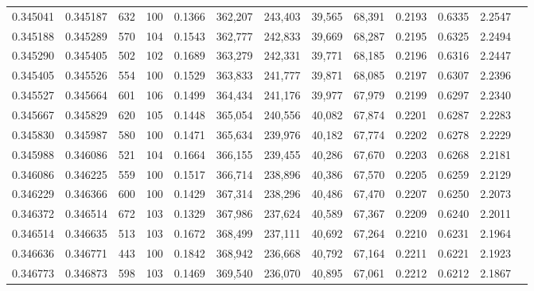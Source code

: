 \begin{tabular}{rrrrrrrrrrrrr}
0.345041 & 0.345187 &   632 & 100 &                                     0.1366 & 362,207 & 243,403 &  39,565 &  68,391 & 0.2193 & 0.6335 & 2.2547 \\
0.345188 & 0.345289 &   570 & 104 &                                     0.1543 & 362,777 & 242,833 &  39,669 &  68,287 & 0.2195 & 0.6325 & 2.2494 \\
0.345290 & 0.345405 &   502 & 102 &                                     0.1689 & 363,279 & 242,331 &  39,771 &  68,185 & 0.2196 & 0.6316 & 2.2447 \\
0.345405 & 0.345526 &   554 & 100 &                                     0.1529 & 363,833 & 241,777 &  39,871 &  68,085 & 0.2197 & 0.6307 & 2.2396 \\
0.345527 & 0.345664 &   601 & 106 &                                     0.1499 & 364,434 & 241,176 &  39,977 &  67,979 & 0.2199 & 0.6297 & 2.2340 \\
0.345667 & 0.345829 &   620 & 105 &                                     0.1448 & 365,054 & 240,556 &  40,082 &  67,874 & 0.2201 & 0.6287 & 2.2283 \\
0.345830 & 0.345987 &   580 & 100 &                                     0.1471 & 365,634 & 239,976 &  40,182 &  67,774 & 0.2202 & 0.6278 & 2.2229 \\
0.345988 & 0.346086 &   521 & 104 &                                     0.1664 & 366,155 & 239,455 &  40,286 &  67,670 & 0.2203 & 0.6268 & 2.2181 \\
0.346086 & 0.346225 &   559 & 100 &                                     0.1517 & 366,714 & 238,896 &  40,386 &  67,570 & 0.2205 & 0.6259 & 2.2129 \\
0.346229 & 0.346366 &   600 & 100 &                                     0.1429 & 367,314 & 238,296 &  40,486 &  67,470 & 0.2207 & 0.6250 & 2.2073 \\
0.346372 & 0.346514 &   672 & 103 &                                     0.1329 & 367,986 & 237,624 &  40,589 &  67,367 & 0.2209 & 0.6240 & 2.2011 \\
0.346514 & 0.346635 &   513 & 103 &                                     0.1672 & 368,499 & 237,111 &  40,692 &  67,264 & 0.2210 & 0.6231 & 2.1964 \\
0.346636 & 0.346771 &   443 & 100 &                                     0.1842 & 368,942 & 236,668 &  40,792 &  67,164 & 0.2211 & 0.6221 & 2.1923 \\
0.346773 & 0.346873 &   598 & 103 &                                     0.1469 & 369,540 & 236,070 &  40,895 &  67,061 & 0.2212 & 0.6212 & 2.1867 \\

\end{tabular}
